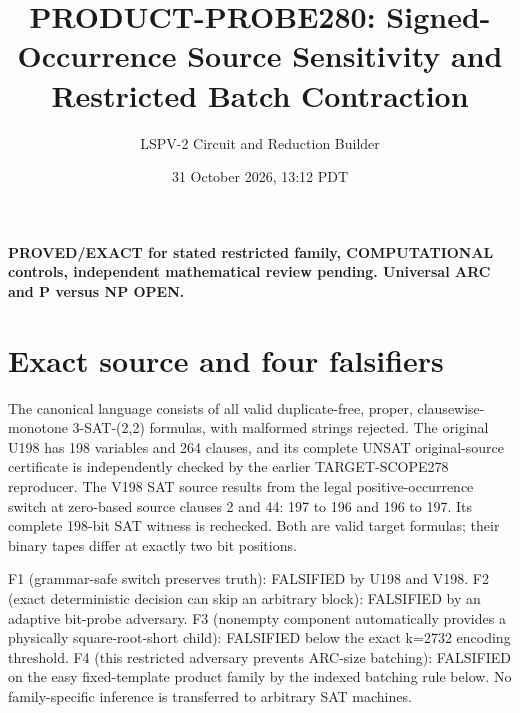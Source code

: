 \documentclass[11pt]{article}
\title{PRODUCT-PROBE280: Signed-Occurrence Source Sensitivity and Restricted Batch Contraction}
\author{LSPV-2 Circuit and Reduction Builder}
\date{31 October 2026, 13:12 PDT}
\begin{document}
\maketitle
\noindent\textbf{PROVED/EXACT for stated restricted family, COMPUTATIONAL controls, independent mathematical review pending. Universal ARC and P versus NP OPEN.}

\section{Exact source and four falsifiers}
The canonical language consists of all valid duplicate-free, proper, clausewise-monotone 3-SAT-(2,2) formulas, with malformed strings rejected. The original U198 has 198 variables and 264 clauses, and its complete UNSAT original-source certificate is independently checked by the earlier TARGET-SCOPE278 reproducer. The V198 SAT source results from the legal positive-occurrence switch at zero-based source clauses 2 and 44: 197 to 196 and 196 to 197. Its complete 198-bit SAT witness is rechecked. Both are valid target formulas; their binary tapes differ at exactly two bit positions.

F1 (grammar-safe switch preserves truth): FALSIFIED by U198 and V198. F2 (exact deterministic decision can skip an arbitrary block): FALSIFIED by an adaptive bit-probe adversary. F3 (nonempty component automatically provides a physically square-root-short child): FALSIFIED below the exact k=2732 encoding threshold. F4 (this restricted adversary prevents ARC-size batching): FALSIFIED on the easy fixed-template product family by the indexed batching rule below. No family-specific inference is transferred to arbitrary SAT machines.
\end{document}
